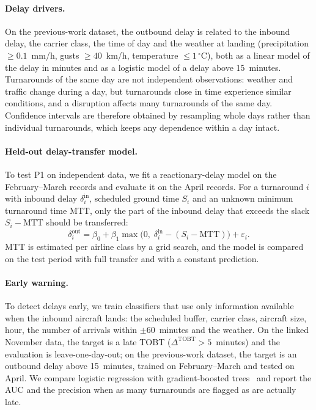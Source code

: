 \paragraph{Delay drivers.}
On the previous-work dataset, the outbound delay is related to the inbound delay, the carrier class, the time of day and the weather at landing (precipitation $\ge0.1$~mm/h, gusts $\ge40$~km/h, temperature $\le1\,^{\circ}$C), both as a linear model of the delay in minutes and as a logistic model of a delay above 15~minutes. Turnarounds of the same day are not independent observations: weather and traffic change during a day, but turnarounds close in time experience similar conditions, and a disruption affects many turnarounds of the same day. Confidence intervals are therefore obtained by resampling whole days rather than individual turnarounds, which keeps any dependence within a day intact.

\paragraph{Held-out delay-transfer model.}
To test P1 on independent data, we fit a reactionary-delay model on the February--March records and evaluate it on the April records. For a turnaround $i$ with inbound delay $\delta^{\mathrm{in}}_i$, scheduled ground time $S_i$ and an unknown minimum turnaround time $\mathrm{MTT}$, only the part of the inbound delay that exceeds the slack $S_i-\mathrm{MTT}$ should be transferred:
\begin{equation}
\delta^{\mathrm{out}}_i=\beta_0+\beta_1\max\bigl(0,\;\delta^{\mathrm{in}}_i-(S_i-\mathrm{MTT})\bigr)+\varepsilon_i.
\label{eq:transfer}
\end{equation}
MTT is estimated per airline class by a grid search, and the model is compared on the test period with full transfer and with a constant prediction.

\paragraph{Early warning.}
To detect delays early, we train classifiers that use only information available when the inbound aircraft lands: the scheduled buffer, carrier class, aircraft size, hour, the number of arrivals within $\pm60$~minutes and the weather. On the linked November data, the target is a late TOBT ($\Delta^{\mathrm{TOBT}}>5$~minutes) and the evaluation is leave-one-day-out; on the previous-work dataset, the target is an outbound delay above 15~minutes, trained on February--March and tested on April. We compare logistic regression with gradient-boosted trees~\cite{pedregosa2011sklearn} and report the AUC and the precision when as many turnarounds are flagged as are actually late.

